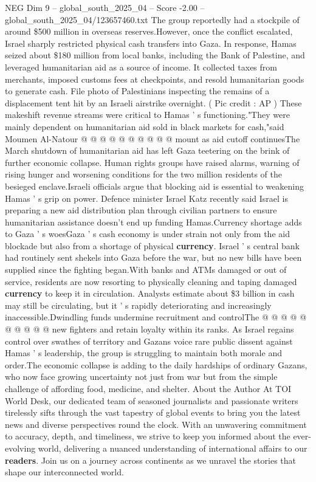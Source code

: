 \begin{textsample}{NEG Dim 9 – global\_south\_2025\_04 – Score -2.00 – global\_south\_2025\_04/123657460.txt}
The group reportedly had a stockpile of around \$500 million in overseas reserves.However, once the conflict escalated, Israel sharply restricted physical cash transfers into Gaza.
In response, Hamas seized about \$180 million from local banks, including the Bank of Palestine, and leveraged humanitarian aid as a source of income.
It collected taxes from merchants, imposed customs fees at checkpoints, and resold humanitarian goods to generate cash.
File photo of Palestinians inspecting the remains of a displacement tent hit by an Israeli airstrike overnight. ( Pic credit : AP ) These makeshift revenue streams were critical to Hamas ' s functioning."They were mainly dependent on humanitarian aid sold in black markets for cash,"said Moumen Al-Natour @ @ @ @ @ @ @ @ @ @ mount as aid cutoff continuesThe March shutdown of humanitarian aid has left Gaza teetering on the brink of further economic collapse.
Human rights groups have raised alarms, warning of rising hunger and worsening conditions for the two million residents of the besieged enclave.Israeli officials argue that blocking aid is essential to weakening Hamas ' s grip on power.
Defence minister Israel Katz recently said Israel is preparing a new aid distribution plan through civilian partners to ensure humanitarian assistance doesn't end up funding Hamas.Currency shortage adds to Gaza ' s woesGaza ' s cash economy is under strain not only from the aid blockade but also from a shortage of physical \textbf{currency}.
Israel ' s central bank had routinely sent shekels into Gaza before the war, but no new bills have been supplied since the fighting began.With banks and ATMs damaged or out of service, residents are now resorting to physically cleaning and taping damaged \textbf{currency} to keep it in circulation.
Analysts estimate about \$3 billion in cash may still be circulating, but it ' s rapidly deteriorating and increasingly inaccessible.Dwindling funds undermine recruitment and controlThe @ @ @ @ @ @ @ @ @ @ new fighters and retain loyalty within its ranks.
As Israel regains control over swathes of territory and Gazans voice rare public dissent against Hamas ' s leadership, the group is struggling to maintain both morale and order.The economic collapse is adding to the daily hardships of ordinary Gazans, who now face growing uncertainty not just from war but from the simple challenge of affording food, medicine, and shelter.
About the Author At TOI World Desk, our dedicated team of seasoned journalists and passionate writers tirelessly sifts through the vast tapestry of global events to bring you the latest news and diverse perspectives round the clock.
With an unwavering commitment to accuracy, depth, and timeliness, we strive to keep you informed about the ever-evolving world, delivering a nuanced understanding of international affairs to our \textbf{readers}.
Join us on a journey across continents as we unravel the stories that shape our interconnected world.

\end{textsample}
